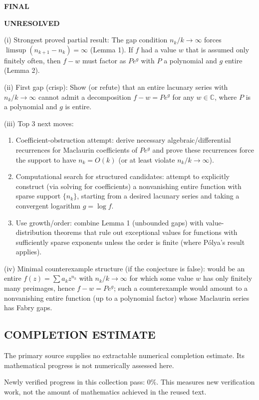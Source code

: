 \medskip
\noindent\textbf{FINAL}

\textbf{UNRESOLVED}

(i) Strongest proved partial result: The gap condition $n_k/k\to\infty$ forces $\limsup (n_{k+1}-n_k)=\infty$ (Lemma 1). If $f$ had a value $w$ that is assumed only finitely often, then $f-w$ must factor as $P e^{g}$ with $P$ a polynomial and $g$ entire (Lemma 2).

(ii) First gap (crisp): Show (or refute) that an entire lacunary series with $n_k/k\to\infty$ cannot admit a decomposition $f-w=P e^{g}$ for any $w\in\mathbb{C}$, where $P$ is a polynomial and $g$ is entire.

(iii) Top 3 next moves:
\begin{enumerate}
\item Coefficient-obstruction attempt: derive necessary algebraic/differential recurrences for Maclaurin coefficients of $P e^{g}$ and prove these recurrences force the support to have $n_k=O(k)$ (or at least violate $n_k/k\to\infty$).
\item Computational search for structured candidates: attempt to explicitly construct (via solving for coefficients) a nonvanishing entire function with sparse support $\{n_k\}$, starting from a desired lacunary series and taking a convergent logarithm $g=\log f$.
\item Use growth/order: combine Lemma 1 (unbounded gaps) with value-distribution theorems that rule out exceptional values for functions with sufficiently sparse exponents unless the order is finite (where P\'olya's result applies).
\end{enumerate}

(iv) Minimal counterexample structure (if the conjecture is false): would be an entire $f(z)=\sum a_k z^{n_k}$ with $n_k/k\to\infty$ for which some value $w$ has only finitely many preimages, hence $f-w=P e^{g}$; such a counterexample would amount to a nonvanishing entire function (up to a polynomial factor) whose Maclaurin series has Fabry gaps.



\subsection*{COMPLETION ESTIMATE}
The primary source supplies no extractable numerical completion estimate. Its mathematical progress is not numerically assessed here.

Newly verified progress in this collection pass: $0\%$. This measures new verification work, not the amount of mathematics achieved in the reused text.
